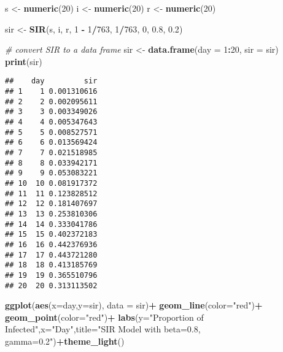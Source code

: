 \documentclass[
]{article}
\newenvironment{Shaded}{\begin{snugshade}}{\end{snugshade}}
\newcommand{\AttributeTok}[1]{\textcolor[rgb]{0.13,0.29,0.53}{#1}}
\newcommand{\CommentTok}[1]{\textcolor[rgb]{0.56,0.35,0.01}{\textit{#1}}}
\newcommand{\DecValTok}[1]{\textcolor[rgb]{0.00,0.00,0.81}{#1}}
\newcommand{\FloatTok}[1]{\textcolor[rgb]{0.00,0.00,0.81}{#1}}
\newcommand{\FunctionTok}[1]{\textcolor[rgb]{0.13,0.29,0.53}{\textbf{#1}}}
\newcommand{\NormalTok}[1]{#1}
\newcommand{\OtherTok}[1]{\textcolor[rgb]{0.56,0.35,0.01}{#1}}
\newcommand{\SpecialCharTok}[1]{\textcolor[rgb]{0.81,0.36,0.00}{\textbf{#1}}}
\newcommand{\StringTok}[1]{\textcolor[rgb]{0.31,0.60,0.02}{#1}}
\begin{document}
\begin{Shaded}
\begin{Highlighting}[]
\NormalTok{s }\OtherTok{\textless{}{-}} \FunctionTok{numeric}\NormalTok{(}\DecValTok{20}\NormalTok{)}
\NormalTok{i }\OtherTok{\textless{}{-}} \FunctionTok{numeric}\NormalTok{(}\DecValTok{20}\NormalTok{)}
\NormalTok{r }\OtherTok{\textless{}{-}} \FunctionTok{numeric}\NormalTok{(}\DecValTok{20}\NormalTok{)}

\NormalTok{sir }\OtherTok{\textless{}{-}} \FunctionTok{SIR}\NormalTok{(s, i, r, }\DecValTok{1} \SpecialCharTok{{-}} \DecValTok{1}\SpecialCharTok{/}\DecValTok{763}\NormalTok{, }\DecValTok{1}\SpecialCharTok{/}\DecValTok{763}\NormalTok{, }\DecValTok{0}\NormalTok{, }\FloatTok{0.8}\NormalTok{, }\FloatTok{0.2}\NormalTok{)}

\CommentTok{\# convert SIR to a data frame}
\NormalTok{sir }\OtherTok{\textless{}{-}} \FunctionTok{data.frame}\NormalTok{(}\AttributeTok{day =} \DecValTok{1}\SpecialCharTok{:}\DecValTok{20}\NormalTok{, }\AttributeTok{sir =}\NormalTok{ sir)}
\FunctionTok{print}\NormalTok{(sir)}
\end{Highlighting}
\end{Shaded}

\begin{verbatim}
##    day         sir
## 1    1 0.001310616
## 2    2 0.002095611
## 3    3 0.003349026
## 4    4 0.005347643
## 5    5 0.008527571
## 6    6 0.013569424
## 7    7 0.021518985
## 8    8 0.033942171
## 9    9 0.053083221
## 10  10 0.081917372
## 11  11 0.123828512
## 12  12 0.181407697
## 13  13 0.253810306
## 14  14 0.333041786
## 15  15 0.402372183
## 16  16 0.442376936
## 17  17 0.443721280
## 18  18 0.413185769
## 19  19 0.365510796
## 20  20 0.313113502
\end{verbatim}

\begin{Shaded}
\begin{Highlighting}[]
\FunctionTok{ggplot}\NormalTok{(}\FunctionTok{aes}\NormalTok{(}\AttributeTok{x=}\NormalTok{day,}\AttributeTok{y=}\NormalTok{sir), }\AttributeTok{data =}\NormalTok{ sir)}\SpecialCharTok{+}
  \FunctionTok{geom\_line}\NormalTok{(}\AttributeTok{color=}\StringTok{"red"}\NormalTok{)}\SpecialCharTok{+}
  \FunctionTok{geom\_point}\NormalTok{(}\AttributeTok{color=}\StringTok{"red"}\NormalTok{)}\SpecialCharTok{+}
  \FunctionTok{labs}\NormalTok{(}\AttributeTok{y=}\StringTok{"Proportion of Infected"}\NormalTok{,}\AttributeTok{x=}\StringTok{"Day"}\NormalTok{,}\AttributeTok{title=}\StringTok{"SIR Model with beta=0.8, gamma=0.2"}\NormalTok{)}\SpecialCharTok{+}\FunctionTok{theme\_light}\NormalTok{()}
\end{Highlighting}
\end{Shaded}
\end{document}
